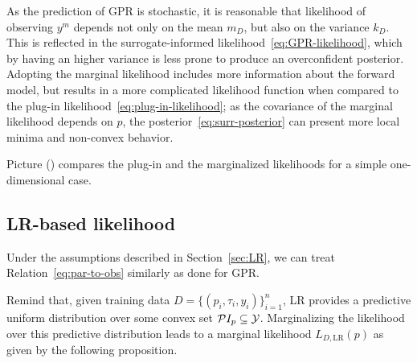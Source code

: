 As the prediction of GPR is stochastic, it is reasonable that likelihood of observing $y^m$ depends not only on the mean $m_D$, but also on the variance $k_D$. 
This is reflected in the surrogate-informed likelihood~\eqref{eq:GPR-likelihood}, which by having an higher variance is less prone to produce an overconfident posterior.
Adopting the marginal likelihood includes more information about the forward model, but results in a more complicated likelihood function when compared to the plug-in likelihood~\eqref{eq:plug-in-likelihood}; as the covariance of the marginal likelihood depends on $p$, the posterior~\ref{eq:surr-posterior} can present more local minima and non-convex behavior.

Picture () compares the plug-in and the marginalized likelihoods for a simple one-dimensional case.


\subsection{LR-based likelihood}\label{sec:LRlike}

Under the assumptions described in Section~\ref{sec:LR}, we can treat Relation~\eqref{eq:par-to-obs} similarly as done for GPR. 

Remind that, given training data $D =\{ (p_i, \tau_i, y_i) \}_{i=1}^n$, LR provides a predictive uniform distribution over some convex set $\mathcal PI_p \subseteq \mathcal Y $.
Marginalizing the likelihood over this predictive distribution leads to a marginal likelihood $L_{D, \text{LR}}(p)$ as given by the following proposition.

